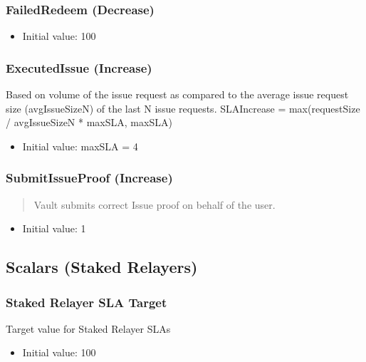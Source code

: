 \documentclass[a4paper,10pt,english]{sphinxmanual}
\begin{document}
\subsubsection{FailedRedeem (Decrease)}
\label{\detokenize{spec/sla:failedredeem-decrease}}\begin{itemize}
\item {} 
Initial value: \sphinxhyphen{}100

\end{itemize}


\subsubsection{ExecutedIssue (Increase)}
\label{\detokenize{spec/sla:executedissue-increase}}
Based on volume of the issue request as compared to the average issue request size (avgIssueSizeN) of the last N issue requests.
SLAIncrease = max(requestSize / avgIssueSizeN * maxSLA, maxSLA)
\begin{itemize}
\item {} 
Initial value: maxSLA = 4

\end{itemize}


\subsubsection{SubmitIssueProof (Increase)}
\label{\detokenize{spec/sla:submitissueproof-increase}}\begin{quote}

Vault submits correct Issue proof on behalf of the user.
\end{quote}
\begin{itemize}
\item {} 
Initial value: 1

\end{itemize}


\subsection{Scalars (Staked Relayers)}
\label{\detokenize{spec/sla:scalars-staked-relayers}}

\subsubsection{Staked Relayer SLA Target}
\label{\detokenize{spec/sla:staked-relayer-sla-target}}
Target value for Staked Relayer SLAs
\begin{itemize}
\item {} 
Initial value: 100

\end{itemize}
\end{document}
